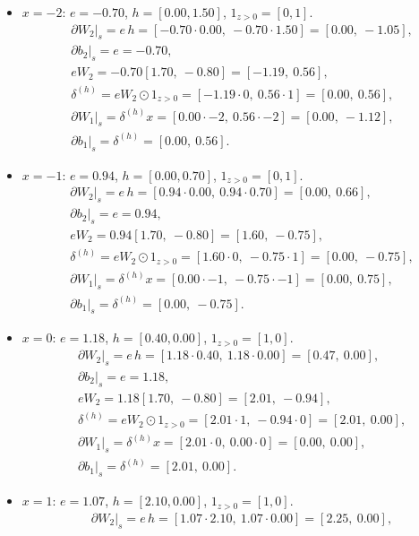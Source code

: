 \documentclass[11pt]{article}
\begin{document}
\begin{itemize}
\item $x=-2$: $e=-0.70$, $h=[0.00, 1.50]$, $1_{z>0}=[0,1]$.
\begin{align*}
&\partial W_2\big|_s = e\,h = [-0.70\cdot0.00,\ -0.70\cdot1.50] = [0.00,\ -1.05],\\
&\partial b_2\big|_s = e = -0.70,\\
&eW_2 = -0.70[1.70,\ -0.80] = [-1.19,\ 0.56],\\
&\delta^{(h)} = eW_2 \odot 1_{z>0} = [-1.19\cdot0,\ 0.56\cdot1] = [0.00,\ 0.56],\\
&\partial W_1\big|_s = \delta^{(h)} x = [0.00\cdot-2,\ 0.56\cdot-2] = [0.00,\ -1.12],\\
&\partial b_1\big|_s = \delta^{(h)} = [0.00,\ 0.56].
\end{align*}
\item $x=-1$: $e=0.94$, $h=[0.00, 0.70]$, $1_{z>0}=[0,1]$.
\begin{align*}
&\partial W_2\big|_s = e\,h = [0.94\cdot0.00,\ 0.94\cdot0.70] = [0.00,\ 0.66],\\
&\partial b_2\big|_s = e = 0.94,\\
&eW_2 = 0.94[1.70,\ -0.80] = [1.60,\ -0.75],\\
&\delta^{(h)} = eW_2 \odot 1_{z>0} = [1.60\cdot0,\ -0.75\cdot1] = [0.00,\ -0.75],\\
&\partial W_1\big|_s = \delta^{(h)} x = [0.00\cdot-1,\ -0.75\cdot-1] = [0.00,\ 0.75],\\
&\partial b_1\big|_s = \delta^{(h)} = [0.00,\ -0.75].
\end{align*}
\item $x=0$: $e=1.18$, $h=[0.40, 0.00]$, $1_{z>0}=[1,0]$.
\begin{align*}
&\partial W_2\big|_s = e\,h = [1.18\cdot0.40,\ 1.18\cdot0.00] = [0.47,\ 0.00],\\
&\partial b_2\big|_s = e = 1.18,\\
&eW_2 = 1.18[1.70,\ -0.80] = [2.01,\ -0.94],\\
&\delta^{(h)} = eW_2 \odot 1_{z>0} = [2.01\cdot1,\ -0.94\cdot0] = [2.01,\ 0.00],\\
&\partial W_1\big|_s = \delta^{(h)} x = [2.01\cdot0,\ 0.00\cdot0] = [0.00,\ 0.00],\\
&\partial b_1\big|_s = \delta^{(h)} = [2.01,\ 0.00].
\end{align*}
\item $x=1$: $e=1.07$, $h=[2.10, 0.00]$, $1_{z>0}=[1,0]$.
\begin{align*}
&\partial W_2\big|_s = e\,h = [1.07\cdot2.10,\ 1.07\cdot0.00] = [2.25,\ 0.00],\\

\end{align*}
\end{itemize}
\end{document}
